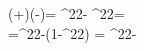 (\alpha+\alpha)(\alpha-\alpha)= \sin^{2}2\alpha - \cos^{2}2\alpha = \\ =\sin^{2}2\alpha-(1-\sin^{2}2\alpha) = \sin^{2}2\alpha-